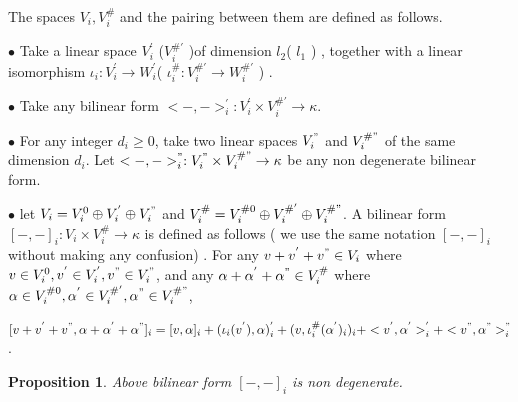 \def\CTEXPreproc{Created by ctex v0.2.12, don't edit!}\documentclass[11pt]{article}
\newtheorem{prop}{Proposition}[section]
\begin{document}
The spaces $V_i , V^{\#}_i$ and the pairing between them are defined as follows.

\noindent $\bullet$ Take a linear space $V^{'}_i $ ($ V^{\# '}_i  $   )of dimension $l_2 $( $l_1$ ) , together with a linear isomorphism
$\iota_i :V^{'}_i \rightarrow W^{'}_i $(  $ \iota^{\#} _i : V^{\# '}_i \rightarrow  W^{\# '}_i $  ) .

\noindent $\bullet$ Take any bilinear form $<-,->^{'}_i : V^{'} _i \times V^{\# '} _i \rightarrow \kappa   $.

\noindent $\bullet$ For any integer $d_i \geq 0$, take two linear spaces $ V^{"} _i  $ and $V^{\# "}_i $ of the same dimension $d_i$. Let
 $<-,->^{"}_i : V^{"} _i \times V^{\# "} _i \rightarrow \kappa $ be any non degenerate bilinear form.

\noindent $\bullet$ let $V_i = V^0 _i \oplus V^{'} _i \oplus V^{"} _i $ and  $V^{\#} _i = V^{\# 0} _i \oplus V^{\# '} _i \oplus V^{\# "} _i $. A bilinear form $[-, -]_i : V_i \times V^{\#} _i \rightarrow \kappa  $ is defined as follows ( we use the same notation $[-,-]_i$ without making any confusion) .
 For any $v+v^{'}+v^{"}\in V_i$ where $v\in  V^0 _i,  v^{'}\in  V^{'} _i  , v^{"}\in  V^{"} _i  $, and any
 $\alpha  +\alpha^{'} +\alpha^{"} \in V^{\#}_i $ where $\alpha\in V^{\# 0} _i ,\alpha^{'}\in V^{\# '} _i , \alpha^{"}\in V^{\# "} _i  $,

$ [v+v^{'}+v^{"}, \alpha  +\alpha^{'} +\alpha^{"}  ]_i = [v,\alpha]_i + ( \iota_i (v^{'}) , \alpha )^{'}_i + (v, \iota^{\#}_i (\alpha^{'})_i )_i + < v^{'} , \alpha^{'}  >^{'}_i + < v^{"} ,\alpha^{"}   >^{"}_i  $.


  \begin{prop}
  Above bilinear form $[-,-]_i$ is non degenerate.

  \end{prop}
\end{document}
